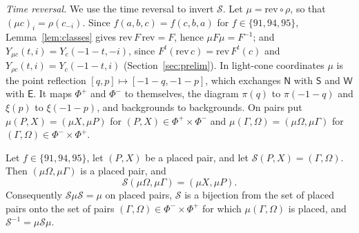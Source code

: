 \emph{Time reversal.} We use the time reversal to invert $\mathcal S$. Let $\mu=\mathrm{rev}\circ\rho$, so that $(\mu c)_i=\rho(c_{-i})$. Since $f(a,b,c)=f(c,b,a)$ for $f\in\{91,94,95\}$, Lemma~\ref{lem:classes} gives $\mathrm{rev}\,F\,\mathrm{rev}=F$, hence $\mu F\mu=F^{-1}$; and $Y_{\mu c}(t,i)=Y_c(-1-t,-i)$, since $F^t(\mathrm{rev}\,c)=\mathrm{rev}\,F^t(c)$ and $Y_{\rho c}(t,i)=Y_c(-1-t,i)$ (Section~\ref{sec:prelim}). In light-cone coordinates $\mu$ is the point reflection $[q,p]\mapsto[-1-q,-1-p]$, which exchanges $\mathsf N$ with $\mathsf S$ and $\mathsf W$ with $\mathsf E$. It maps $\Phi^+$ and $\Phi^-$ to themselves, the diagram $\pi(q)$ to $\pi(-1-q)$ and $\xi(p)$ to $\xi(-1-p)$, and backgrounds to backgrounds. On pairs put $\mu(P,X)=(\mu X,\mu P)$ for $(P,X)\in\Phi^+\times\Phi^-$ and $\mu(\Gamma,\Omega)=(\mu \Omega,\mu\Gamma)$ for $(\Gamma,\Omega)\in\Phi^-\times\Phi^+$.

\begin{proposition}\label{cl:prop:dual}
Let $f\in\{91,94,95\}$, let $(P,X)$ be a placed pair, and let $\mathcal S(P,X)=(\Gamma,\Omega)$. Then $(\mu \Omega,\mu\Gamma)$ is a placed pair, and
\[
\mathcal S(\mu \Omega,\mu\Gamma)=(\mu X,\mu P).
\]
Consequently $\mathcal S\mu \mathcal S=\mu$ on placed pairs, $\mathcal S$ is a bijection from the set of placed pairs onto the set of pairs $(\Gamma,\Omega)\in\Phi^-\times\Phi^+$ for which $\mu(\Gamma,\Omega)$ is placed, and $\mathcal S^{-1}=\mu \mathcal S\mu$.
\end{proposition}

